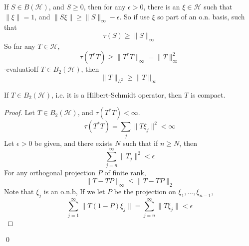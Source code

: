 If $S\in B(\mathcal{H})$, and $S\geq 0$, then for any $\epsilon>0$, there is an $\xi\in\mathcal{H}$ such that $\|\xi\|=1$, and $\|S\xi\|\geq\|S\|_\infty-\epsilon$. So if use $\xi$ so part of an o.n. basis, such that 
\begin{equation*}
    \tau(S)\geq\|S\|_\infty
\end{equation*}
So far any $T\in\mathcal{H}$, 
\begin{equation*}
    \tau(T^*T)\geq\|T^*T\|_\infty=\|T\|_\infty^2
\end{equation*}
-evaluatioIf $T\in B_2(\mathcal{H})$, then 
\begin{equation*}
    \|T\|_{L^2}\geq\|T\|_\infty
\end{equation*}

\begin{proposition}
    If $T\in B_2(\mathcal{H})$, i.e. it is a Hilbert-Schmidt operator, then $T$ is compact.
\end{proposition}
\begin{proof}
    Let $T\in B_2(\mathcal{H})$, and $\tau(T^*T)<\infty$. 
    \begin{equation*}
        \tau(T^*T)=\sum_j\|T\xi_j\|^2<\infty
    \end{equation*}
    Let $\epsilon>0$ be given, and there exists $N$ such that if $n\geq N$, then 
    \begin{equation*}
        \sum_{j=n}^\infty \|T_j\|^2<\epsilon
    \end{equation*}
    For any orthogonal projection $P$ of finite rank, 
    \begin{equation*}
        \|T-TP\|_\infty\leq\|T-TP\|_2
    \end{equation*}
    Note that $\xi_j$ is an o.n.b, If we let $P$ be the projection on $\xi_1, ..., \xi_{n-1}$, 
    \begin{equation*}
        \sum_{j=1}^\infty \|T(1-P)\xi_j\|=\sum_{j=n}^\infty\|T\xi_j\|<\epsilon
    \end{equation*}
\end{proof}
\qed

